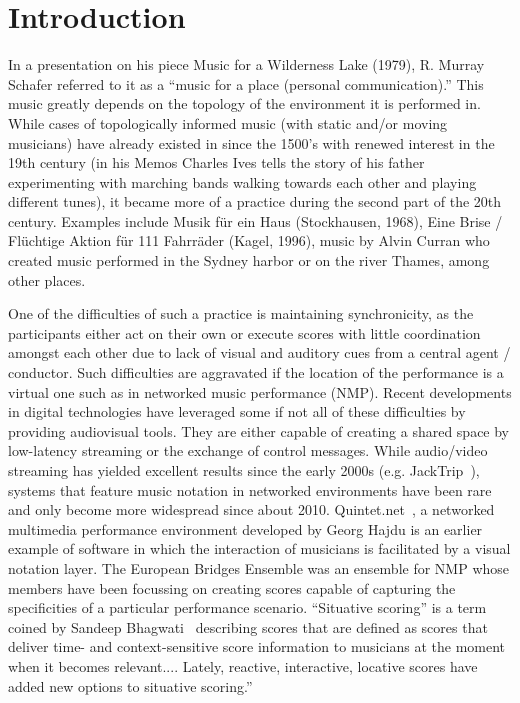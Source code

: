 
\section{Introduction}\label{sec:intro}

%
%
%

In a presentation on his piece Music for a Wilderness Lake (1979), R. Murray Schafer referred to it as a ``music for a place (personal communication).'' 
This music greatly depends on the topology of the environment it is performed in. While cases of topologically informed music (with static and/or moving musicians) have already existed in since the 1500’s with renewed interest in the 19th century (in his Memos Charles Ives tells the story of his father experimenting with marching bands walking towards each other and playing different tunes), it became more of a practice during the second part of the 20th century. Examples include Musik f\"ur ein Haus (Stockhausen, 1968), Eine Brise / Fl\"uchtige Aktion f\"ur 111 Fahrr\"ader (Kagel, 1996), music by Alvin Curran who created music performed in the Sydney harbor or on the river Thames, among other places.

One of the difficulties of such a practice is maintaining synchronicity, as the participants either act on their own or execute scores with little coordination amongst each other due to lack of visual and auditory cues from a central agent / conductor. Such difficulties are aggravated if the location of the performance is a virtual one such as in networked music performance (NMP). Recent developments in digital technologies have leveraged some if not all of these difficulties by providing audiovisual tools. They are either capable of creating a shared space by low-latency streaming or the exchange of control messages. While audio/video streaming has yielded excellent results since the early 2000s  (e.g. JackTrip~\cite{caceres2010jacktrip}), systems that feature music notation in networked environments have been rare and only become more widespread since about 2010. Quintet.net~\cite{hajdu2005quintet}, a networked multimedia performance environment developed by Georg Hajdu is an earlier example of software in which the interaction of musicians is facilitated by a visual notation layer. The European Bridges Ensemble was an ensemble for NMP whose members have been  focussing on creating scores capable of capturing the specificities of a particular performance scenario. ``Situative scoring'' is a term coined by Sandeep Bhagwati~\cite{bhagwati2017vexations} describing scores that are defined as scores that deliver time- and context-sensitive score information to musicians at the moment when it becomes relevant.... Lately, reactive, interactive, locative scores have added new options to situative scoring.''


